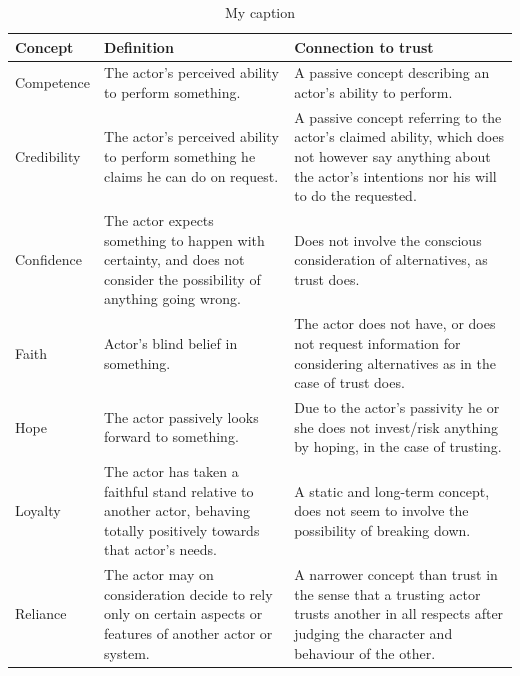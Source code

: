 \begin{table}[]
\centering
\caption{My caption}
\label{my-label}
\begin{tabular}{lll}
\hline
Concept     & Definition                                                                                                              & Connection to trust                                                                                                                                            \\ \hline
Competence  & The actor's perceived ability to perform something.                                                                     & A passive concept describing an actor's ability to perform.                                                                                                    \\
Credibility & The actor's perceived ability to perform something he claims he can do on request.                                      & A passive concept referring to the actor's claimed ability, which does not however say anything about the actor's intentions nor his will to do the requested. \\
Confidence  & The actor expects something to happen with certainty, and does not consider the possibility of anything going wrong.    & Does not involve the conscious consideration of alternatives, as trust does.                                                                                   \\
Faith       & Actor's blind belief in something.                                                                                      & The actor does not have, or does not request information for considering alternatives as in the case of trust does.                                            \\
Hope        & The actor passively looks forward to something.                                                                         & Due to the actor's passivity he or she does not invest/risk anything by hoping, in the case of trusting.                                                       \\
Loyalty     & The actor has taken a faithful stand relative to another actor, behaving totally positively towards that actor's needs. & A static and long-term concept, does not seem to involve the possibility of breaking down.                                                                     \\
Reliance    & The actor may on consideration decide to rely only on certain aspects or features of another actor or system.           & A narrower concept than trust in the sense that a trusting actor trusts another in all respects after judging the character and behaviour of the other.        \\ \hline
\end{tabular}
\end{table}

